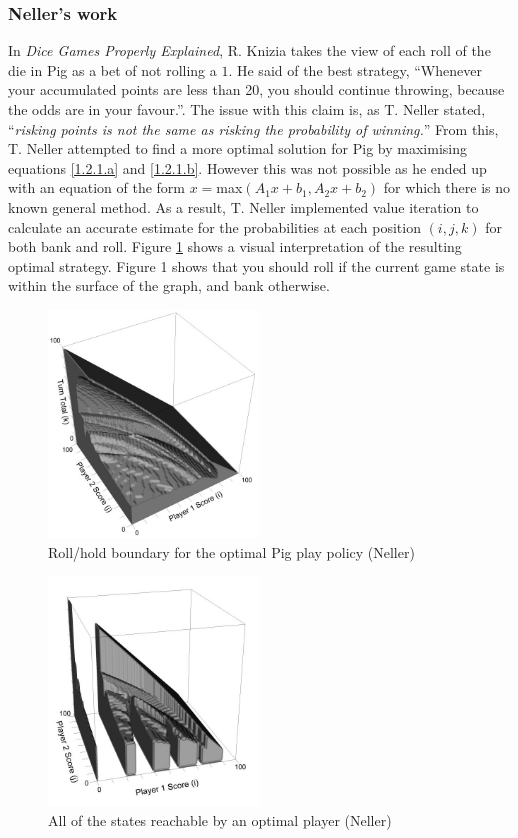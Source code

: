 \documentclass[a4paper,titlepage]{article}
\begin{document}
\subsubsection{Neller's work}
In \textit{Dice Games Properly Explained}, R. Knizia takes the view of each roll of the die in Pig as a bet of not rolling a $1$. He said of the best strategy, ``Whenever your accumulated points are less than 20, you should continue throwing, because the odds are in your favour.''\cite{knizia2010dice}. The issue with this claim is, as T. Neller stated, ``\textit{risking points is not the same as risking the probability of winning.}''\cite{neller2004optimal} From this, T. Neller attempted to find a more optimal solution for Pig by maximising equations \ref{1.2.1.a} and \ref{1.2.1.b}. However this was not possible as he ended up with an equation of the form $x=$max$ (A_1 x+b_1,A_2 x+b_2)$ for which there is no known general method. As a result, T. Neller implemented value iteration to calculate an accurate estimate for the probabilities at each position $(i,j,k)$ for both bank and roll. Figure \ref{figure1} shows a visual interpretation of the resulting optimal strategy. Figure 1 shows that you should roll if the current game state is within the surface of the graph, and bank otherwise.

\begin{figure}[!htb]
\centering
\includegraphics[width=0.5\textwidth]{neller_optimal_solution}
\caption{Roll\slash hold boundary for the optimal Pig play policy (Neller)\label{figure1}}
\end{figure}
\begin{figure}[!htb]
\centering
\includegraphics[width=0.5\textwidth]{neller_optimal_solution_2}
\caption{All of the states reachable by an optimal player (Neller)\label{figure2}}
\end{figure}
\end{document}
